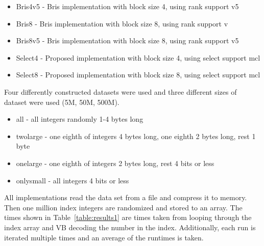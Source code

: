 \begin{itemize}
  \item Bris4v5 - Bris implementation with block size 4, using rank support v5
  \item Bris8 - Bris implementation with block size 8, using rank support v
  \item Bris8v5 - Bris implementation with block size 8, using rank support v5
  \item Select4 - Proposed implementation with block size 4, using select support mcl
  \item Select8 - Proposed implementation with block size 8, using select support mcl
\end{itemize}






Four differently constructed datasets were used and three different sizes of dataset were used (5M, 50M, 500M). 

\begin{itemize}
  \item all - all integers randomly 1-4 bytes long
  \item twolarge - one eighth of integers 4 bytes long, one eighth 2 bytes long, rest 1 byte    
  \item onelarge - one eighth of integers 2 bytes long, rest 4 bits or less
  \item onlysmall - all integers 4 bits or less
\end{itemize}

All implementations read the data set from a file and compress it to memory. Then one million index integers are randomized and stored to an array. The times shown in Table~\ref{table:results1} 
are times taken from looping through the index array and VB decoding the number in the index. Additionally, each run is iterated multiple times and an average of the runtimes is taken. 

